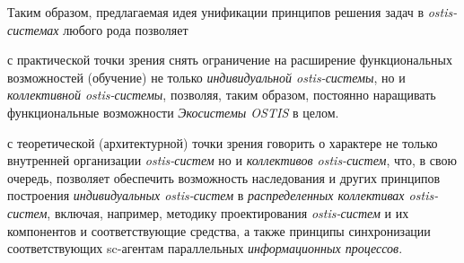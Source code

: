 Таким образом, предлагаемая идея унификации принципов решения задач в \textit{ostis-системах} любого рода позволяет 
\begin{textitemize}
	\item с практической точки зрения снять ограничение на расширение функциональных возможностей (обучение) не только \textit{индивидуальной ostis-системы}, но и \textit{коллективной ostis-системы}, позволяя, таким образом, постоянно наращивать функциональные возможности \textit{Экосистемы OSTIS} в целом. 
	\item с теоретической (архитектурной) точки зрения говорить о  характере не только внутренней организации \textit{ostis-систем} но и \textit{коллективов ostis-систем}, что, в свою очередь, позволяет обеспечить возможность наследования и других принципов построения \textit{индивидуальных ostis-систем} в \textit{распределенных коллективах ostis-систем}, включая, например, методику проектирования \textit{ostis-систем} и их компонентов и соответствующие средства, а также принципы синхронизации соответствующих sc-агентам параллельных \textit{информационных процессов}.
\end{textitemize}	

